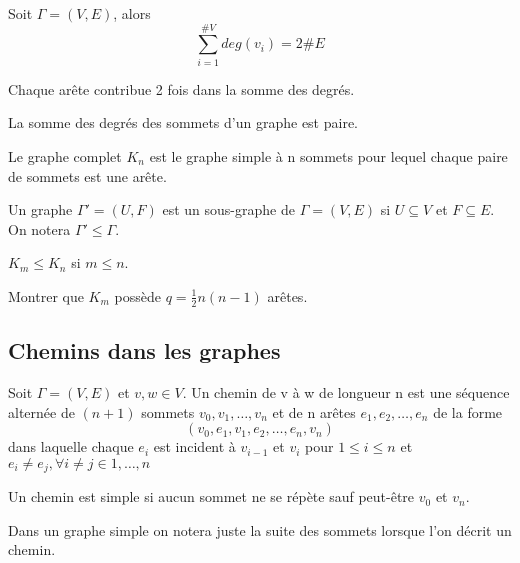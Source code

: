 

\begin{thrm}
Soit $\Gamma = (V,E)$, alors $$\sum_{i=1}^{\#V} deg(v_{i}) = 2\#E$$
\end{thrm}

\begin{demo}
Chaque arête contribue 2 fois dans la somme des degrés.
\end{demo}

\begin{corll}
La somme des degrés des sommets d'un graphe est paire. 
\end{corll}

\newpage

\begin{defn}
Le graphe complet $K_{n}$ est le graphe simple à n sommets pour lequel chaque paire de sommets est une arête.
\end{defn}

\begin{exmp}
	
\end{exmp}

\begin{defn}
Un graphe ${\Gamma}'=(U,F)$ est un sous-graphe de $\Gamma=(V,E)$ si $ U \subseteq V$ et $F \subseteq E$. On notera $ {\Gamma}' \leq \Gamma$.
\end{defn}

\begin{exmp}
$ K_{m} \leq K_{n}$ si $ m \leq n$.
\end{exmp}

\begin{exo}
Montrer que $K_{m}$ possède $ q=\frac{1}{2}n(n-1)$ arêtes.
\end{exo}


\subsection{Chemins dans les graphes}

\begin{defn}
Soit $\Gamma = (V,E)$ et $v,w \in V$. Un chemin de v à w de longueur n est une séquence alternée de $(n+1)$ sommets $v_{0},v_{1},\ldots,v_{n}$ et de n arêtes $e_{1},e_{2},\ldots,e_{n}$ de la forme $$ (v_{0},e_{1},v_{1},e_{2},\ldots,e_{n},v_{n})$$ dans laquelle chaque $e_{i}$ est incident à $v_{i-1}$ et $v_{i}$ pour $1 \leq i \leq n$ et $ e_{i} \neq e_{j} , \forall i \neq j \in 1,\ldots,n$ 

Un chemin est simple si aucun sommet ne se répète sauf peut-être $v_{0}$ et $v_{n}$. 

Dans un graphe simple on notera juste la suite des sommets lorsque l'on décrit un chemin. 

\end{defn}

